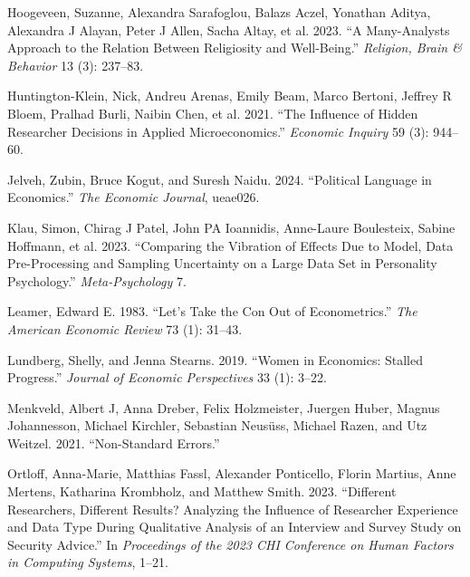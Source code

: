 \documentclass[
  letterpaper,
  DIV=11,
  numbers=noendperiod]{scrartcl}
\newlength{\cslhangindent}
\newlength{\cslentryspacingunit} %
\newenvironment{CSLReferences}[2] %
 {%
  \setlength{\parindent}{0pt}
  \ifodd #1
  \let\oldpar\par
  \def\par{\hangindent=\cslhangindent\oldpar}
  \fi
  \setlength{\parskip}{#2\cslentryspacingunit}
 }%
 {}
\begin{document}
\begin{CSLReferences}{1}{0}
\leavevmode{}%
Hoogeveen, Suzanne, Alexandra Sarafoglou, Balazs Aczel, Yonathan Aditya,
Alexandra J Alayan, Peter J Allen, Sacha Altay, et al. 2023. {``A
Many-Analysts Approach to the Relation Between Religiosity and
Well-Being.''} \emph{Religion, Brain \& Behavior} 13 (3): 237--83.

\leavevmode{}%
Huntington-Klein, Nick, Andreu Arenas, Emily Beam, Marco Bertoni,
Jeffrey R Bloem, Pralhad Burli, Naibin Chen, et al. 2021. {``The
Influence of Hidden Researcher Decisions in Applied Microeconomics.''}
\emph{Economic Inquiry} 59 (3): 944--60.

\leavevmode{}%
Jelveh, Zubin, Bruce Kogut, and Suresh Naidu. 2024. {``Political
Language in Economics.''} \emph{The Economic Journal}, ueae026.

\leavevmode{}%
Klau, Simon, Chirag J Patel, John PA Ioannidis, Anne-Laure Boulesteix,
Sabine Hoffmann, et al. 2023. {``Comparing the Vibration of Effects Due
to Model, Data Pre-Processing and Sampling Uncertainty on a Large Data
Set in Personality Psychology.''} \emph{Meta-Psychology} 7.

\leavevmode{}%
Leamer, Edward E. 1983. {``Let's Take the Con Out of Econometrics.''}
\emph{The American Economic Review} 73 (1): 31--43.

\leavevmode{}%
Lundberg, Shelly, and Jenna Stearns. 2019. {``Women in Economics:
Stalled Progress.''} \emph{Journal of Economic Perspectives} 33 (1):
3--22.

\leavevmode{}%
Menkveld, Albert J, Anna Dreber, Felix Holzmeister, Juergen Huber,
Magnus Johannesson, Michael Kirchler, Sebastian Neusüss, Michael Razen,
and Utz Weitzel. 2021. {``Non-Standard Errors.''}

\leavevmode{}%
Ortloff, Anna-Marie, Matthias Fassl, Alexander Ponticello, Florin
Martius, Anne Mertens, Katharina Krombholz, and Matthew Smith. 2023.
{``Different Researchers, Different Results? Analyzing the Influence of
Researcher Experience and Data Type During Qualitative Analysis of an
Interview and Survey Study on Security Advice.''} In \emph{Proceedings
of the 2023 CHI Conference on Human Factors in Computing Systems},
1--21.


\end{CSLReferences}
\end{document}
